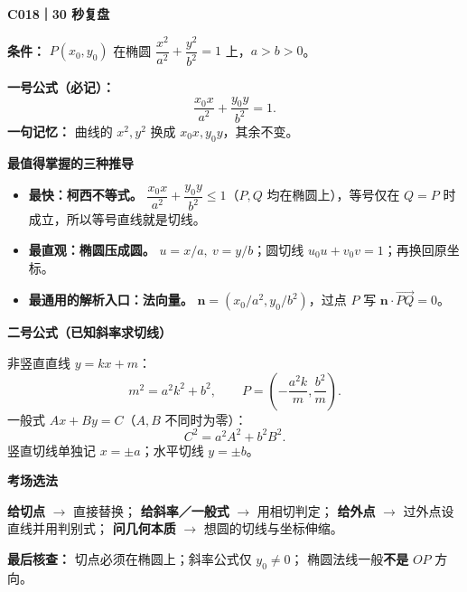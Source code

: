 \begin{summarybox}
\textbf{\textcolor{CSummary}{C018｜30 秒复盘}}

\textbf{条件：} $P(x_0,y_0)$ 在椭圆
$\dfrac{x^2}{a^2}+\dfrac{y^2}{b^2}=1$ 上，$a>b>0$。

\textbf{一号公式（必记）：}
\[
\boxed{\frac{x_0x}{a^2}+\frac{y_0y}{b^2}=1.}
\]
\textbf{一句记忆：} 曲线的 $x^2,y^2$ 换成 $x_0x,y_0y$，其余不变。

\medskip
\textbf{\textcolor{CSummary}{最值得掌握的三种推导}}
\begin{itemize}[leftmargin=*, itemsep=0.4em]
 \item \textbf{最快：柯西不等式。}
 $\dfrac{x_0x}{a^2}+\dfrac{y_0y}{b^2}\le1$（$P,Q$ 均在椭圆上），等号仅在 $Q=P$ 时成立，所以等号直线就是切线。
 \item \textbf{最直观：椭圆压成圆。}
 $u=x/a,\ v=y/b$；圆切线 $u_0u+v_0v=1$；再换回原坐标。
 \item \textbf{最通用的解析入口：法向量。}
 $\boldsymbol n=(x_0/a^2,y_0/b^2)$，过点 $P$ 写
 $\boldsymbol n\cdot\overrightarrow{PQ}=0$。
\end{itemize}

\medskip
\textbf{\textcolor{CSummary}{二号公式（已知斜率求切线）}}

非竖直直线 $y=kx+m$：
\[
 \boxed{m^2=a^2k^2+b^2},\qquad
 \boxed{P=\left(-\frac{a^2k}{m},\frac{b^2}{m}\right)}.
\]
一般式 $Ax+By=C$（$A,B$ 不同时为零）：
\[
 \boxed{C^2=a^2A^2+b^2B^2}.
\]
竖直切线单独记 $x=\pm a$；水平切线 $y=\pm b$。

\medskip
\textbf{\textcolor{CSummary}{考场选法}}

\textbf{给切点} $\to$ 直接替换；
\textbf{给斜率／一般式} $\to$ 用相切判定；
\textbf{给外点} $\to$ 过外点设直线并用判别式；
\textbf{问几何本质} $\to$ 想圆的切线与坐标伸缩。

\textbf{最后核查：} 切点必须在椭圆上；斜率公式仅 $y_0\ne0$；
椭圆法线一般\textbf{不是} $OP$ 方向。
\end{summarybox}
